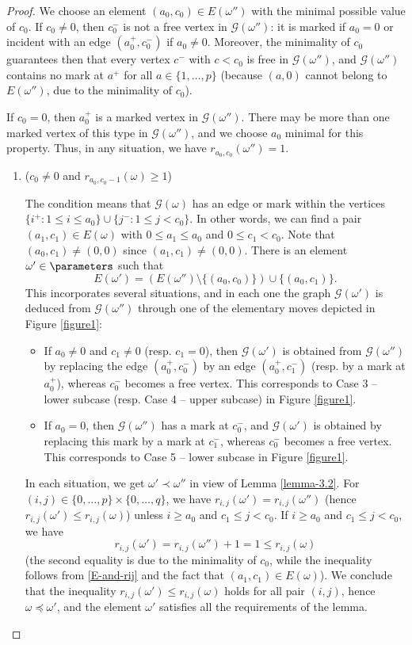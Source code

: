 \begin{proof}
We choose an element $(a_0,c_0)\in E(\omega'') $ with the minimal possible value of $c_0$.
If $c_0\not=0$, then $c_0^-$ is not a free vertex in $\mathcal{G}(\omega'')$: it is marked if $a_0=0$ or incident with an edge $(a_0^+,c_0^-)$ if $a_0\not=0$. Moreover, the minimality of $c_0$ guarantees then that every vertex $c^-$ with $c<c_0$ is free in $\mathcal{G}(\omega'')$, and $\mathcal{G}(\omega'')$ contains no mark at $a^+$ for all $a\in\{1,\ldots,p\}$ (because $(a,0)$ cannot belong to $E(\omega'')$, due to the minimality of $c_0$).

If $c_0=0$, then $a_0^+$ is a marked vertex in $\mathcal{G}(\omega'')$.
There may be more than one marked vertex of this type in $\mathcal{G}(\omega'')$, and we choose $a_0$ minimal for this property. Thus, in any situation, we have $r_{a_0,c_0}(\omega'')=1$.

\begin{enumerate}[label=\textbf{Case \arabic*}]
\item ($c_0\not=0$ and $r_{a_0,c_0-1}(\omega)\geq 1$)

\noindent The condition means that $\mathcal{G}(\omega)$ has an edge or mark within the vertices $\{i^+:1\leq i\leq a_0\}\cup\{j^-:1\leq j<c_0\}$.
In other words, we can find a pair $(a_1,c_1)\in E(\omega)$
with $0\leq a_1\leq a_0$ and $0\leq c_1<c_0$.
Note that $(a_0,c_1)\not=(0,0)$ since $(a_1,c_1)\not=(0,0)$.
There is an element
$\omega'\in\parameters$ such that
\[
E(\omega')=(E(\omega'')\setminus\{(a_0,c_0)\})\cup\{(a_0,c_1)\}.
\]
This incorporates several situations, and in each one the graph $\mathcal{G}(\omega')$ is deduced from $\mathcal{G}(\omega'')$ through one of the elementary moves depicted in Figure \ref{figure1}:
\begin{itemize}
\item If $a_0\not=0$ and $c_1\not=0$ (resp. $c_1=0$), then $\mathcal{G}(\omega')$ is obtained from $\mathcal{G}(\omega'')$ by replacing
the edge $(a_0^+,c_0^-)$ by an edge $(a_0^+,c_1^-)$ (resp. by a mark
at $a_0^+$), whereas $c_0^-$ becomes a free vertex. This
corresponds to Case 3 -- lower subcase (resp. Case 4 -- upper
subcase) in Figure \ref{figure1}.
\item If $a_0=0$, then $\mathcal{G}(\omega'')$
has a mark at $c_0^-$, and $\mathcal{G}(\omega')$
is obtained by replacing this mark by a mark at $c_1^-$, whereas $c_0^-$ becomes a free vertex.
This corresponds to Case 5 -- lower subcase in Figure \ref{figure1}.
\end{itemize}
In each situation, we get $\omega'\prec\omega''$ in view of Lemma \ref{lemma-3.2}.
For $(i,j)\in\{0,\ldots,p\}\times\{0,\ldots,q\}$, we have
$r_{i,j}(\omega')=r_{i,j}(\omega'')$ (hence $r_{i,j}(\omega')\leq r_{i,j}(\omega)$) unless $i\geq a_0$ and $c_1\leq j<c_0$.
If $i\geq a_0$ and $c_1\leq j<c_0$, we have
\[r_{i,j}(\omega')=r_{i,j}(\omega'')+1=1\leq r_{i,j}(\omega)\]
(the second equality is due to the minimality of $c_0$, while the inequality follows from \eqref{E-and-rij} and the fact that $(a_1,c_1)\in E(\omega)$). We conclude that the inequality $r_{i,j}(\omega')\leq r_{i,j}(\omega)$ holds for all pair $(i,j)$, hence $\omega\preceq\omega'$, and the element $\omega'$ satisfies all the requirements of the lemma.




\end{enumerate}
\end{proof}
